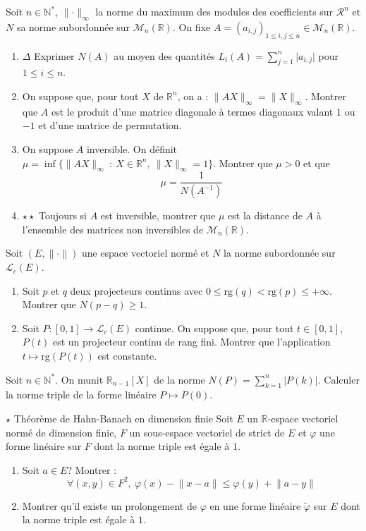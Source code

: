 \documentclass[french,a4paper]{article}
\newcommand{\N}{\mathbb{N}}
\newcommand{\R}{\mathbb{R}}
\newcommand{\st}{^*}
\newcommand{\inv}{^{-1}}
\theoremstyle{plain}
\theoremstyle{definition}
\theoremstyle{remark}
\begin{document}
\begin{ex}{}
	Soit $n\in\N\st$, $\lVert\cdot\rVert_\infty$ la norme du maximum des modules des coefficients sur $\mathcal{R}^n$ et $N$ sa norme subordonnée sur $\mathcal{M}_n(\R)$. On fixe $A=(a_{i,j})_{1\leqslant i,j\leqslant n}\in\mathcal{M}_n(\R)$.
	\begin{enumerate}
		\item $\Delta$ Exprimer $N(A)$ au moyen des quantités $L_i(A)=\displaystyle\sum_{j=1}^{n}\lvert a_{i,j}\rvert$ pour $1\leqslant i\leqslant n$.
		\item On suppose que, pour tout $X$ de $\R^n$, on a : $\lVert AX\rVert_\infty=\lVert X\rVert_\infty$. Montrer que $A$ est le produit d'une matrice diagonale à termes diagonaux valant $1$ ou $-1$ et d'une matrice de permutation.
		\item On suppose $A$ inversible. On définit $\mu=\inf\{\lVert AX\rVert_\infty\ : \ X\in\R^n,\ \lVert X\rVert_\infty=1\}$. Montrer que $\mu>0$ et que $$\mu=\frac{1}{N(A\inv)}$$
		\item $\star\star$ Toujours si $A$ est inversible, montrer que $\mu$ est la distance de $A$ à l'ensemble des matrices non inversibles de $\mathcal{M}_n(\R)$.
	\end{enumerate}
\end{ex}

\begin{ex}{}
	Soit $(E,\lVert\cdot\rVert)$ une espace vectoriel normé et $N$ la norme subordonnée sur $\mathcal{L}_c(E)$.
	\begin{enumerate}
		\item Soit $p$ et $q$ deux projecteurs continus avec $0\leqslant\text{rg}(q)<\text{rg}(p)\leqslant+\infty$. Montrer que $N(p-q)\geqslant 1$.
		\item Soit $P:[0,1]\to\mathcal{L}_c(E)$ continue. On suppose que, pour tout $t\in[0,1]$, $P(t)$ est un projecteur continu de rang fini. Montrer que l'application $t\mapsto\text{rg}(P(t))$ est constante.
	\end{enumerate}
\end{ex}

\begin{ex}{}
	Soit $n\in\N\st$. On munit $\R_{n-1}[X]$ de la norme $N(P)=\displaystyle\sum_{k=1}^{n}\lvert P(k)\rvert$. Calculer la norme triple de la forme linéaire $P\mapsto P(0)$.
\end{ex}

\begin{ex}{$\star$ Théorème de Hahn-Banach en dimension finie}
	Soit $E$ un $\R$-espace vectoriel normé de dimension finie, $F$ un sous-espace vectoriel de strict de $E$ et $\varphi$ une forme linéaire sur $F$ dont la norme triple est égale à $1$.
	\begin{enumerate}
		\item Soit $a\in E$? Montrer : $$\forall (x,y)\in F^2,\ \varphi(x)-\lVert x-a\rVert\leqslant\varphi(y)+\lVert a-y\rVert$$
		\item Montrer qu'il existe un prolongement de $\varphi$ en une forme linéaire $\tilde{\varphi}$ sur $E$ dont la norme triple est égale à $1$.
	\end{enumerate}
\end{ex}
\end{document}
